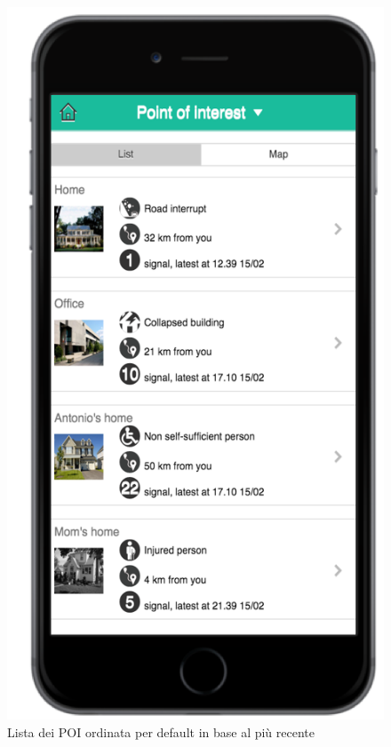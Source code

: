 \begin{itemize}
\begin{figure}[H]
	\centering
	\includegraphics[scale=1]{interfaccia/poilist.png}
	\caption{Lista dei POI ordinata per default in base al più recente }
	\label{fig:poilist}
\end{figure}
\begin{figure}[H]
	\centering

\end{figure}
\end{itemize}
